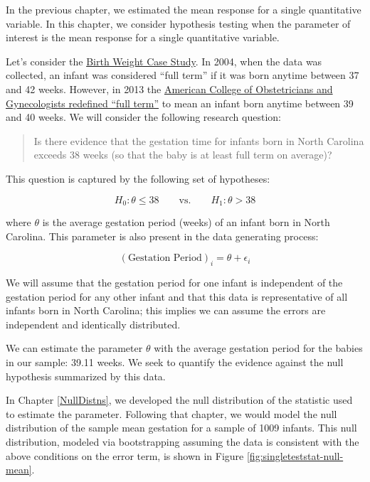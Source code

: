 \documentclass[]{book}
\theoremstyle{plain}
\theoremstyle{mydefn}
\theoremstyle{myexmpl}
\theoremstyle{remark}
\begin{document}
In the previous chapter, we estimated the mean response for a single
quantitative variable. In this chapter, we consider hypothesis testing
when the parameter of interest is the mean response for a single
quantitative variable.

Let's consider the \protect\hyperlink{CaseBabies}{Birth Weight Case
Study}. In 2004, when the data was collected, an infant was considered
``full term'' if it was born anytime between 37 and 42 weeks. However,
in 2013 the
\href{https://journals.lww.com/greenjournal/Fulltext/2013/11000/Committee_Opinion_No_579___Definition_of_Term.39.aspx}{American
College of Obstetricians and Gynecologists redefined ``full term''} to
mean an infant born anytime between 39 and 40 weeks. We will consider
the following research question:

\begin{quote}
Is there evidence that the gestation time for infants born in North
Carolina exceeds 38 weeks (so that the baby is at least full term on
average)?
\end{quote}

This question is captured by the following set of hypotheses:

\[H_0: \theta \leq 38 \qquad \text{vs.} \qquad H_1: \theta > 38\]

where \(\theta\) is the average gestation period (weeks) of an infant
born in North Carolina. This parameter is also present in the data
generating process:

\[(\text{Gestation Period})_i = \theta + \epsilon_i\]

We will assume that the gestation period for one infant is independent
of the gestation period for any other infant and that this data is
representative of all infants born in North Carolina; this implies we
can assume the errors are independent and identically distributed.

We can estimate the parameter \(\theta\) with the average gestation
period for the babies in our sample: 39.11 weeks. We seek to quantify
the evidence against the null hypothesis summarized by this data.

In Chapter \ref{NullDistns}, we developed the null distribution of the
statistic used to estimate the parameter. Following that chapter, we
would model the null distribution of the sample mean gestation for a
sample of 1009 infants. This null distribution, modeled via
bootstrapping assuming the data is consistent with the above conditions
on the error term, is shown in Figure
\ref{fig:singleteststat-null-mean}.
\end{document}
